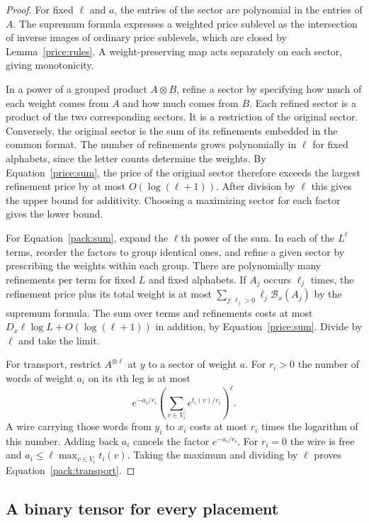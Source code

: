 \begin{proof}
For fixed $\ell$ and $a$, the entries of the sector are polynomial in
the entries of $A$. The supremum formula expresses a weighted price
sublevel as the intersection of inverse images of ordinary price
sublevels, which are closed by Lemma~\ref{price:rules}. A
weight-preserving map acts separately on each sector, giving
monotonicity.

In a power of a grouped product $A\otimes B$, refine a sector by
specifying how much of each weight comes from $A$ and how much comes
from $B$. Each refined sector is a product of the two corresponding
sectors. It is a restriction of the original sector. Conversely, the
original sector is the sum of its refinements embedded in the common
format. The number of refinements grows polynomially in $\ell$ for
fixed alphabets, since the letter counts determine the weights. By
Equation~\eqref{price:sum}, the price of the original sector therefore
exceeds the largest refinement price by at most $O(\log(\ell+1))$.
After division by $\ell$ this gives the upper bound for additivity.
Choosing a maximizing sector for each factor gives the lower bound.

For Equation~\eqref{pack:sum}, expand the $\ell$th power of the sum.
In each of the $L^\ell$ terms, reorder the factors to group identical
ones, and refine a given sector by prescribing the weights within each
group. There are polynomially many refinements per term for fixed $L$
and fixed alphabets. If $A_j$ occurs $\ell_j$ times, the refinement
price plus its total weight is at most
$\sum_{j:\ell_j>0}\ell_j\mathcal B_x(A_j)$ by the supremum formula.
The sum over terms and refinements costs at most
$D_x\ell\log L+O(\log(\ell+1))$ in addition, by
Equation~\eqref{price:sum}. Divide by $\ell$ and take the limit.

For transport, restrict $A^{\otimes\ell}$ at $y$ to a sector of
weight $a$. For $r_i>0$ the number of words of weight $a_i$ on its
$i$th leg is at most
\[
 e^{-a_i/r_i}\left(\sum_{v\in V_i}e^{t_i(v)/r_i}\right)^\ell .
\]
A wire carrying those words from $y_i$ to $x_i$ costs at most $r_i$
times the logarithm of this number. Adding back $a_i$ cancels the
factor $e^{-a_i/r_i}$. For $r_i=0$ the wire is free and
$a_i\le\ell\max_{v\in V_i}t_i(v)$. Taking the maximum and dividing by
$\ell$ proves Equation~\eqref{pack:transport}.
\end{proof}

\subsection{A binary tensor for every placement}

